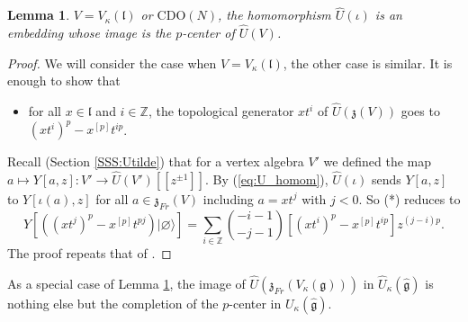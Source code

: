 \documentclass{amsart}
\newtheorem{Lem}[Thm]{Lemma}
\theoremstyle{definition}
\newcommand{\g}{\mathfrak{g}}
\newcommand{\Z}{\mathbb{Z}}
\newcommand{\lf}{\mathfrak{l}}
\newcommand{\CDO}{\mathrm{CDO}}
\newcommand{\frz}{\mathfrak{z}}
\numberwithin{equation}{section}
\begin{document}
\begin{Lem}\label{Lem:p_centers_universal_enveloping}
$V=V_\kappa(\lf)$ or $\CDO(N)$,
the homomorphism $\widehat{U}(\iota)$ is an embedding whose image is the $p$-center of $\widehat{U}(V)$.
\end{Lem}
\begin{proof}
We will consider the case when $V=V_\kappa(\lf)$, the other case is similar. 
It is enough to show that 
\begin{itemize}
\item[(*)]
for all $x\in \lf$ and $i\in \Z$, the topological generator $xt^i$ of $\widehat{U}(\mathfrak{z}(V))$ goes to $(xt^i)^p-x^{[p]}t^{ip}$. 
\end{itemize}
Recall (Section \ref{SSS:Utilde}) that for a vertex algebra $V'$ we defined the map $a\mapsto Y[a,z]:V'\rightarrow \widehat{U}(V')[[z^{\pm 1}]]$. By (\ref{eq:U_homom}), $\widehat{U}(\iota)$ sends $Y[a,z]$ to $Y[\iota(a),z]$ for all $a\in \mathfrak{z}_{Fr}(V)$ including $a=xt^j$ with $j<0$. So (*) reduces to 
\begin{equation}\label{eq:Y_sq_brack_id}
Y[\left((xt^j)^p-x^{[p]}t^{pj}\right)|\varnothing\rangle]=
\sum_{i\in \Z}{-i-1\choose -j-1}[(xt^{i})^p-x^{[p]}t^{ip}]z^{(j-i)p}.
\end{equation}
The proof repeats that of \cite[Lemma 2.3]{AW}.
\end{proof}

As a special case of Lemma \ref{Lem:p_centers_universal_enveloping}, the image of $\widehat{U}(\frz_{Fr}(V_\kappa(\g)))$
in $\widehat{U}_\kappa(\hat{\g})$ is nothing else but the completion of the $p$-center in $U_\kappa(\hat{\g})$.
\end{document}
